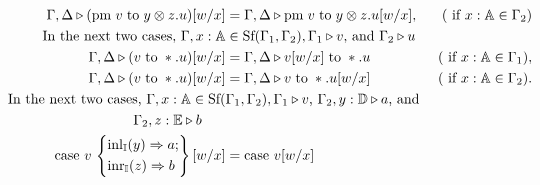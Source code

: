 \begin{definition}
\begin{align*}
  \hspace{-23pt} \Gamma, \Delta  \triangleright (\text{pm} \hspace{3 pt} v \hspace{3 pt} \text{to} \hspace{3 pt} y \otimes z. u)[w/x] &= \Gamma, \Delta  \triangleright \text{pm} \hspace{3 pt} v \hspace{3 pt} \text{to} \hspace{3 pt} y \otimes z. u[w/x],  &  (\text{ if } x: \mathbb{A} \in \Gamma_2) \\
  \hspace{-23pt}\text{In the next two cases, }\Gamma,x: \mathbb{A} &  \in \text{Sf}(\Gamma_1,\Gamma_2), \Gamma_1 \triangleright v \text{, and } \Gamma_2 \triangleright u  \\
  \hspace{-23pt}\Gamma, \Delta  \triangleright(v \hspace{3 pt} \text{to} \hspace{3 pt} *.u)[w/x] &= \Gamma, \Delta  \triangleright v[w/x] \hspace{3 pt} \text{to} \hspace{3 pt} *.u&  (\text{ if } x: \mathbb{A} \in \Gamma_1),\\
  \hspace{-23pt}\Gamma, \Delta  \triangleright(v \hspace{3 pt} \text{to} \hspace{3 pt} *.u)[w/x] &= \Gamma, \Delta  \triangleright v \hspace{3 pt} \text{to} \hspace{3 pt} *.u[w/x] &  (\text{ if } x: \mathbb{A} \in \Gamma_2).\\
  \hspace{-23pt}\text{In the next two cases, }\Gamma,x: \mathbb{A}  \in \text{Sf}(&\Gamma_1,\Gamma_2), \Gamma_1 \triangleright v \text{, } \Gamma_2, y: \mathbb{D}\triangleright a   \text{, and } \\
   & \hspace{-66pt} \Gamma_2, z: \mathbb{E}\triangleright b  \\
   \hspace{-23pt} \text{case } v \,  
  \left\{
    \begin{aligned} 
    &\inl_{\typeI}(y) \Rightarrow a; \\
    &\inr_{\typeI}(z) \Rightarrow  b  \\ 
  \end{aligned}  
  \right\}[w/x] &=  \text{case } v [w/x]  \,  

\end{align*}
\end{definition}
